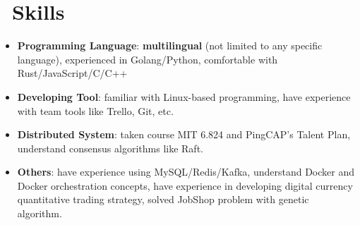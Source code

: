 \documentclass{resume}
\newcommand{\en}[1]{#1}
\newcommand{\zh}[1]{}
\begin{document}
\section{\faCogs\ \en{Skills}\zh{技能}}
\begin{itemize}[parsep=0.25ex]
      \item \en{\textbf{Programming Language}:
                  \textbf{multilingual} (not limited to any specific language), 
                  experienced in Golang/Python, 
                  comfortable with Rust/JavaScript/C/C++}
            \zh{\textbf{编程语言}:
                  \textbf{泛语言}（编程不受特定语言限制），
                  熟悉 Golang/Python，
                  了解 Rust/JavaScript/C/C++ 等}

      \item \en{\textbf{Developing Tool}:
                  familiar with Linux-based programming,
                  have experience with team tools like Trello, Git, etc.}
            \zh{\textbf{开发工具}:
                  熟悉 Linux，有 Trello、Slack, Git 等团队合作工具的使用经验}

      \item \en{\textbf{Distributed System}:
                  taken course MIT 6.824 and PingCAP's Talent Plan,
                  understand consensus algorithms like Raft.}
            \zh{\textbf{分布式系统}:
                  自主学习了 MIT 6.824 和 PingCAP's Talent Plan 课程，
                  了解 Raft 算法}

      \item \en{\textbf{Others}:
                  have experience using MySQL/Redis/Kafka, 
                  understand Docker and Docker orchestration concepts, 
                  have experience in developing digital currency quantitative trading strategy, 
                  solved JobShop problem with genetic algorithm.}
            \zh{\textbf{其它}:
                  有 MySQL/Redis/Kafka 使用经验，了解容器及容器编排相关概念，
                  开发过数字货币量化交易策略，使用遗传算法解决过 JobShop 问题}
\end{itemize}
\end{document}
